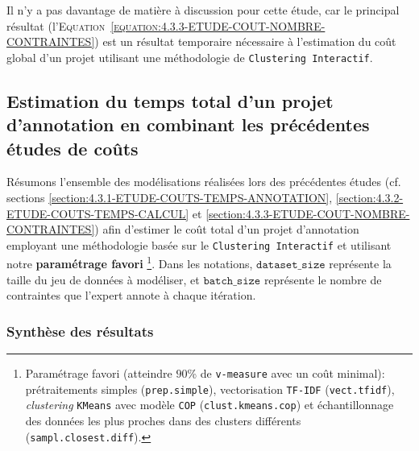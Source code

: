 			\begin{leftBarAuthorOpinion}
				Il n'y a pas davantage de matière à discussion pour cette étude, car le principal résultat (l'\textsc{Equation~\ref{equation:4.3.3-ETUDE-COUT-NOMBRE-CONTRAINTES}}) est un résultat temporaire nécessaire à l'estimation du coût global d'un projet utilisant une méthodologie de \texttt{Clustering Interactif}.
			\end{leftBarAuthorOpinion}
	
	\subsection{Estimation du temps total d'un projet d'annotation en combinant les précédentes études de coûts}
	\label{section:4.3.4-ETUDE-COUTS-TOTAL}
	
		Résumons l'ensemble des modélisations réalisées lors des précédentes études (cf. sections \ref{section:4.3.1-ETUDE-COUTS-TEMPS-ANNOTATION}, \ref{section:4.3.2-ETUDE-COUTS-TEMPS-CALCUL} et \ref{section:4.3.3-ETUDE-COUT-NOMBRE-CONTRAINTES}) afin d'estimer le coût total d'un projet d'annotation employant une méthodologie basée sur le \texttt{Clustering Interactif} et utilisant notre \textbf{paramétrage favori} \footnote{
			Paramétrage favori (atteindre $90$\% de \texttt{v-measure} avec un coût minimal): prétraitements simples (\texttt{prep.simple}), vectorisation \texttt{TF-IDF} (\texttt{vect.tfidf}), \textit{clustering} \texttt{KMeans} avec modèle \texttt{COP} (\texttt{clust.kmeans.cop}) et échantillonnage des données les plus proches dans des clusters différents (\texttt{sampl.closest.diff}).
		}.
		Dans les notations, $\texttt{dataset\_size}$ représente la taille du jeu de données à modéliser, et $\texttt{batch\_size}$ représente le nombre de contraintes que l'expert annote à chaque itération.

		\subsubsection{Synthèse des résultats}
			
